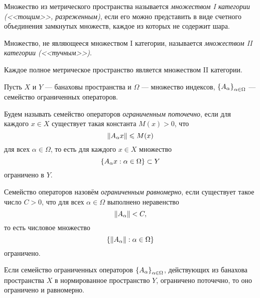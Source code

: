 \begin{definition}
    Множество из метрического пространства называется \emph{множеством I
    категории
    (<<тощим>>, разреженным)}, если его можно представить в виде счетного объединения замкнутых
    множеств, каждое из которых не содержит шара.
\end{definition}

\begin{definition}
    Множество, не являющееся множеством I категории, называется \emph{множеством
    II категории (<<тучным>>)}.
\end{definition}

\begin{theorem}[Бэра]
    Каждое полное метрическое пространство является множеством II категории.
\end{theorem}

Пусть $X$ и $Y$ --- банаховы пространства и $\Omega$ --- множество индексов,
$\left\{A_\alpha\right\}_{\alpha \in \Omega}$ --- семейство ограниченных операторов.

Будем называть семейство операторов \emph{ограниченным поточечно}, если для
каждого $x \in X$ существует такая константа $M(x) > 0$, что
\[ \left\|A_\alpha x\right\| \leqslant M(x) \]
для всех $\alpha \in \Omega$, то есть для каждого $x \in X$ множество
\[ \left\{A_\alpha x : \alpha \in \Omega\right\} \subset Y \]
ограничено в $Y$.

Семейство операторов назовём \emph{ограниченным равномерно}, если существует такое
число $C > 0$, что для всех $\alpha \in \Omega$ выполнено неравенство
\[ \left\|A_\alpha\right\| < C, \]
то есть числовое множество
\[ \left\{\left\|A_\alpha\right\| : \alpha \in \Omega\right\} \]
ограничено.

\begin{theorem}
    Если семейство ограниченных операторов $\left\{A_\alpha\right\}_{\alpha \in \Omega}$,
    действующих из банахова пространства $X$ в нормированное пространство $Y$, 
    ограничено поточечно, то оно ограничено и равномерно. 
\end{theorem}

